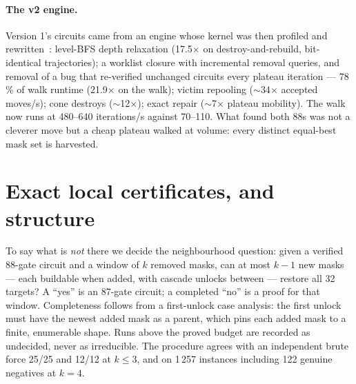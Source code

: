 \documentclass[11pt,a4paper]{article}
\begin{document}
\paragraph{The v2 engine.} Version 1's circuits came from an engine whose
kernel was then profiled and rewritten~\cite{Methods}: level-BFS depth
relaxation (17.5$\times$ on destroy-and-rebuild, bit-identical trajectories); a
worklist closure with incremental removal queries, and removal of a bug that
re-verified unchanged circuits every plateau iteration --- 78\,\% of walk
runtime (21.9$\times$ on the walk); victim repooling ($\sim$34$\times$ accepted
moves/s); cone destroys ($\sim$12$\times$); exact repair ($\sim$7$\times$
plateau mobility). The walk now runs at 480--640 iterations/s against 70--110.
What found both 88s was not a cleverer move but a cheap plateau walked at
volume: every distinct equal-best mask set is harvested.

\section{Exact local certificates, and structure}
\label{sec:certificates}

To say what is \emph{not} there we decide the neighbourhood question: given a
verified 88-gate circuit and a window of $k$ removed masks, can at most $k-1$
new masks --- each buildable when added, with cascade unlocks between ---
restore all 32 targets? A ``yes'' is an 87-gate circuit; a completed ``no'' is
a proof for that window. Completeness follows from a first-unlock case
analysis: the first unlock must have the newest added mask as a parent, which
pins each added mask to a finite, enumerable shape. Runs above the proved
budget are recorded as
undecided, never as irreducible. The procedure agrees with an independent brute
force 25/25 and 12/12 at $k \le 3$, and on 1\,257 instances including 122
genuine negatives at $k = 4$.
\end{document}
